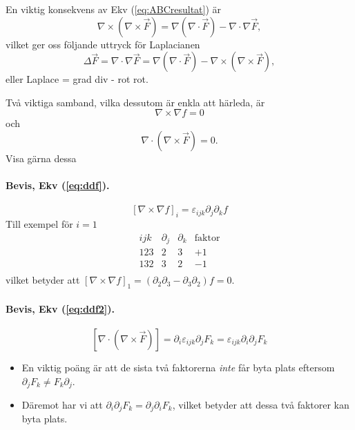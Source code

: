 \documentclass[%
oneside,                 %
final,                   %
10pt]{article}
\begin{document}
En viktig konsekvens av Ekv (\ref{eq:ABCresultat}) är
\begin{equation}
  \nabla \times \left( \nabla \times \vec{F} \right) = \nabla \left( \nabla \cdot \vec{F} \right) - \nabla \cdot \nabla \vec{F},
\end{equation}
vilket ger oss följande uttryck för Laplacianen
\begin{equation}
  \Delta \vec{F} = \nabla \cdot \nabla \vec{F} = \nabla \left( \nabla \cdot \vec{F} \right) - \nabla \times \left( \nabla \times \vec{F} \right),
\end{equation}
eller Laplace = grad div - rot rot.

Två viktiga samband, vilka dessutom är enkla att härleda, är 
\begin{equation}
\label{eq:ddf}
  \nabla \times \nabla f = 0
\end{equation}
och
\begin{equation}
\label{eq:ddf2}
  \nabla \cdot \left( \nabla \times \vec{F}\right) = 0.
\end{equation}
Visa gärna dessa

\paragraph{Bevis, Ekv (\ref{eq:ddf}).}
\begin{equation}
  \left[ \nabla \times \nabla f \right]_i = \varepsilon_{ijk} \partial_j \partial_k f
\end{equation}
Till exempel för $i=1$
\begin{equation}
  \begin{array}{llll}
  	ijk & \partial_j & \partial_k & \mathrm{faktor} \\
  	123 & 2 & 3 & +1 \\
  	132 & 3 & 2 & -1 \\
  \end{array}
\end{equation}
vilket betyder att $\left[ \nabla \times \nabla f \right]_1 = \left( \partial_2\partial_3 - \partial_3\partial_2 \right) f = 0$. 

\paragraph{Bevis, Ekv (\ref{eq:ddf2}).}
\begin{equation}
  \left[ \nabla \cdot \left( \nabla \times \vec{F} \right) \right] = \partial_i \varepsilon_{ijk} \partial_j F_k = \varepsilon_{ijk} \partial_i \partial_j F_k
\end{equation}
\begin{itemize}
\item En viktig poäng är att de sista två faktorerna \emph{inte} får byta plats eftersom $\partial_j F_k \neq F_k \partial_j$.

\item Däremot har vi att $\partial_i \partial_j F_k = \partial_j \partial_i F_k$, vilket betyder att dessa två faktorer kan byta plats.
\end{itemize}
\end{document}
